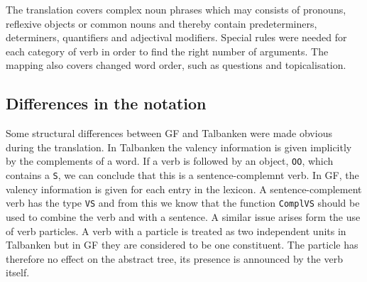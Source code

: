 \documentclass{report}
\begin{document}
The translation covers complex noun phrases which may consists of pronouns,
reflexive objects or common nouns and thereby contain predeterminers, 
determiners, quantifiers and adjectival modifiers. Special rules were needed
for each category of verb in order to find the right number of arguments.
The mapping also covers changed word order, such as questions and topicalisation.



\subsection{Differences in the notation}
Some structural differences between GF and Talbanken were made obvious during the
translation.
In Talbanken the valency information is given implicitly by the complements
of a word. If a verb is followed by an object, \verb-OO-, which contains a
\verb-S-, we can conclude that this is a sentence-complemnt verb.
In GF, the valency information is given for each entry in the lexicon.
A sentence-complement verb has the type \verb-VS- and from this we know 
that the function \verb-ComplVS- should be used to combine the verb and with a 
sentence.
A similar issue arises form the use of verb particles. A verb with a
particle is treated as two independent units in Talbanken but in GF they are
considered to be one constituent. %
The particle has therefore no effect on the abstract tree, its presence is
announced by the verb itself.
\end{document}

